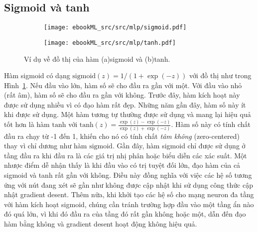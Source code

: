 \subsection{Sigmoid và tanh}
\begin{figure}[t]
\begin{subfigure}{0.49\textwidth}
\texttt{[image: ebookML\_src/src/mlp/sigmoid.pdf]}
\caption{}
\label{fig:14_5a}
\end{subfigure}
\begin{subfigure}{0.49\textwidth}
\texttt{[image: ebookML\_src/src/mlp/tanh.pdf]}
\caption{}
\label{fig:14_5b}
\end{subfigure}
\caption{
Ví dụ về đồ thị của hàm (a){sigmoid} và (b){tanh}.
}
\label{fig:14_5}
\end{figure}



Hàm sigmoid có dạng $\text{sigmoid}(z) = 1/(1 + \exp(-z))$ với đồ thị như
trong
Hình~\ref{fig:14_5a}. Nếu đầu vào lớn, hàm số sẽ cho đầu ra gần với một. Với đầu
vào nhỏ (rất âm), hàm số sẽ cho đầu ra gần với không. Trước đây, hàm kích hoạt này
được sử dụng nhiều vì có đạo hàm rất đẹp. Những năm gần đây, hàm số
này ít khi được sử dụng. Một hàm tương tự thường được sử dụng và mang lại hiệu
quả tốt hơn là hàm $\text{tanh}$ với $\displaystyle \text{tanh}(z) =
\frac{\exp(z) -
\exp{(-z)}}{\exp(z) + \exp(-z)}$. Hàm số
này có tính chất đầu ra chạy từ -1 đến 1, khiến cho nó có tính chất \textit{tâm không} (zero-centered) thay vì chỉ dương như hàm $\text{sigmoid}$. Gần đây, hàm sigmoid
chỉ được sử dụng ở tầng đầu ra khi đầu ra là các giá trị nhị phân hoặc biểu diễn các xác suất.
Một nhược điểm dễ nhận thấy là khi đầu vào có trị tuyệt đối lớn, đạo hàm của cả sigmoid và tanh rất gần với không. Điều này đồng nghĩa với
việc các hệ số tương ứng với nút đang xét sẽ gần như không được cập nhật khi sử
dụng công thức cập nhật gradient desent. Thêm nữa, khi khởi tạo các hệ số cho
mạng neuron đa tầng với hàm kích hoạt sigmoid, chúng cần tránh trường
hợp đầu vào một tầng ẩn nào đó quá lớn, vì khi đó đầu ra của tầng đó rất gần không hoặc một, dẫn đến đạo hàm bằng không và gradient desent hoạt động
không hiệu quả.




